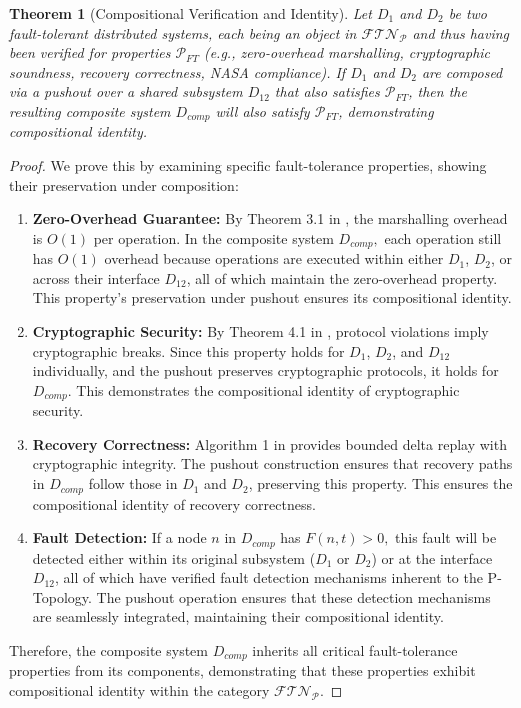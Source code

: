 \documentclass[10pt]{article}
\newtheorem{theorem}{Theorem}[section]
\begin{document}
\begin{theorem}[Compositional Verification and Identity]
Let $D_{1}$ and $D_{2}$ be two fault-tolerant distributed systems, each being an object in $\mathcal{FTN}_{\mathcal{P}}$ and thus having been verified for properties $\mathcal{P}_{FT}$ (e.g., zero-overhead marshalling, cryptographic soundness, recovery correctness, NASA compliance). If $D_{1}$ and $D_{2}$ are composed via a pushout over a shared subsystem $D_{12}$ that also satisfies $\mathcal{P}_{FT}$, then the resulting composite system $D_{comp}$ will also satisfy $\mathcal{P}_{FT}$, demonstrating compositional identity.
\end{theorem}
\begin{proof}
We prove this by examining specific fault-tolerance properties, showing their preservation under composition:
\begin{enumerate}
    \item \textbf{Zero-Overhead Guarantee:} By Theorem 3.1 in \cite{OBINexusDataMarshalling}, the marshalling overhead is $O(1)$ per operation. In the composite system $D_{comp},$ each operation still has $O(1)$ overhead because operations are executed within either $D_{1}$, $D_{2}$, or across their interface $D_{12}$, all of which maintain the zero-overhead property. This property's preservation under pushout ensures its compositional identity.
    \item \textbf{Cryptographic Security:} By Theorem 4.1 in \cite{OBINexusDataMarshalling}, protocol violations imply cryptographic breaks. Since this property holds for $D_{1}$, $D_{2}$, and $D_{12}$ individually, and the pushout preserves cryptographic protocols, it holds for $D_{comp}$. This demonstrates the compositional identity of cryptographic security.
    \item \textbf{Recovery Correctness:} Algorithm 1 in \cite{OBINexusDataMarshalling} provides bounded delta replay with cryptographic integrity. The pushout construction ensures that recovery paths in $D_{comp}$ follow those in $D_{1}$ and $D_{2}$, preserving this property. This ensures the compositional identity of recovery correctness.
    \item \textbf{Fault Detection:} If a node $n$ in $D_{comp}$ has $F(n,t)>0,$ this fault will be detected either within its original subsystem ($D_{1}$ or $D_{2}$) or at the interface $D_{12}$, all of which have verified fault detection mechanisms inherent to the P-Topology. The pushout operation ensures that these detection mechanisms are seamlessly integrated, maintaining their compositional identity.
\end{enumerate}
Therefore, the composite system $D_{comp}$ inherits all critical fault-tolerance properties from its components, demonstrating that these properties exhibit compositional identity within the category $\mathcal{FTN}_{\mathcal{P}}$.
\end{proof}
\end{document}
